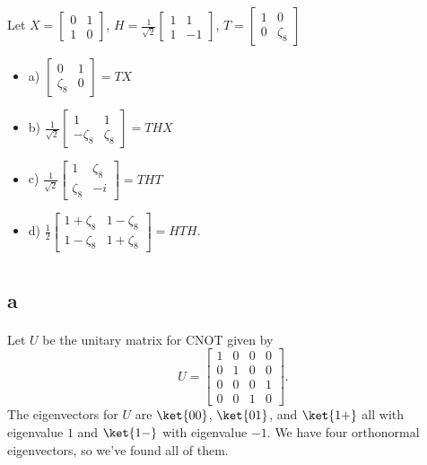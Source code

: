 \documentclass[letterpaper,12pt,oneside,onecolumn]{article}
\begin{document}
\section{}
\paragraph{}
Let $X = \begin{bmatrix} 0 & 1 \\ 1 & 0 \end{bmatrix}$, $H = \frac{1}{\sqrt{2}} \begin{bmatrix} 1 & 1 \\ 1 & -1 \end{bmatrix}$, $T = \begin{bmatrix} 1 & 0 \\ 0 & \zeta_8\end{bmatrix}$
\begin{itemize}
\item a) $\begin{bmatrix} 0 & 1 \\ \zeta_8 & 0 \end{bmatrix} = TX$
\item b) $\frac{1}{\sqrt{2}}\begin{bmatrix} 1 & 1 \\ -\zeta_8 & \zeta_8 \end{bmatrix} = THX$
\item c) $\frac{1}{\sqrt{2}}\begin{bmatrix} 1 &\zeta_8 \\ \zeta_8 & -i\end{bmatrix}=THT$
\item d) $\frac{1}{2} \begin{bmatrix} 1+\zeta_8 & 1-\zeta_8 \\ 1-\zeta_8 & 1+\zeta_8\end{bmatrix}=HTH.$
\end{itemize}
\section{}
\subsection{a}
\paragraph{}
Let $U$ be the unitary matrix for CNOT given by
$$U = \begin{bmatrix} 1 & 0 & 0 & 0 \\ 0& 1 & 0 & 0 \\ 0 & 0 & 0 & 1 \\ 0& 0 & 1 &0 \end{bmatrix}.$$
The eigenvectors for $U$ are $\ket{00}$, $\ket{01}$, and $\ket{1+}$ all with eigenvalue $1$ and $\ket{1-}$ with eigenvalue $-1$. We have four orthonormal eigenvectors, so we've found all of them.
\end{document}
